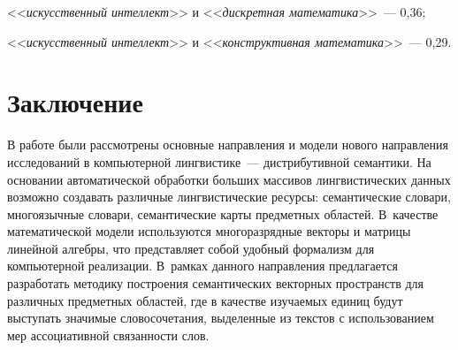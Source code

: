 \begin{multicols}{2}
<<\textit{искусственный интеллект}>> и <<\textit{дискретная 
математика}>>~--- 0,36;

<<\textit{искусственный интеллект}>> и <<\textit{конструктивная 
математика}>>~--- 0,29.

\section{Заключение}

В работе были рассмотрены основные направления и модели нового 
направления исследований в компьютерной лингвистике~--- 
дистрибутивной семантики. На основании автоматической обработки 
больших массивов лингвистических данных возможно создавать 
различные лингвистические ресурсы: семантические словари, 
многоязычные словари, семантические карты предметных областей. 
В~качестве математической модели используются многоразрядные 
векторы и мат\-ри\-цы линейной ал\-геб\-ры, что представляет собой 
удобный формализм для компьютерной реализации. В~рамках данного 
направления предлагается разработать методику построения 
семантических векторных пространств для различных предметных 
областей, где в качестве изучаемых единиц будут выступать значимые 
словосочетания, выделенные из текстов с использованием мер 
ассоциативной связанности слов. 

{\small\frenchspacing
{%
\begin{thebibliography}{99}


\end{thebibliography}}}
\end{multicols}
